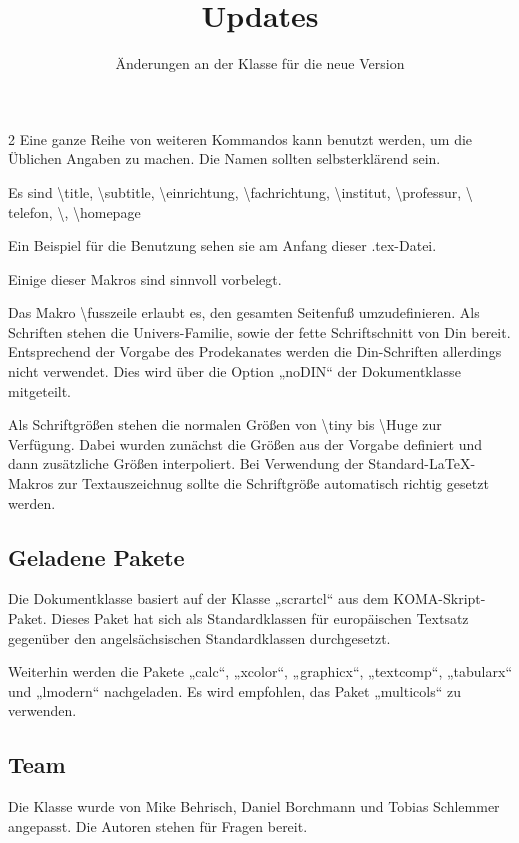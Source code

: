 \documentclass[serifmath,a0paper,noDIN,Mathematik]{tudmathposter}
\begin{document}
\begin{multicols}2
  Eine ganze Reihe von weiteren Kommandos kann benutzt werden, um
  die Üblichen Angaben zu machen. Die Namen sollten selbsterklärend
  sein.

  Es sind \textbackslash title, \textbackslash subtitle,
  \textbackslash einrichtung, \textbackslash fachrichtung,
  \textbackslash institut, \textbackslash professur, \textbackslash
  telefon, \textbackslash \fax, \textbackslash homepage
  
  Ein Beispiel für die Benutzung sehen sie am Anfang dieser .tex-Datei.
  
  Einige dieser Makros sind sinnvoll vorbelegt.
  
  Das Makro
  \textbackslash fusszeile erlaubt es, den gesamten Seitenfuß
  umzudefinieren.
  Als Schriften stehen die Univers-Familie, sowie der fette
  Schriftschnitt von Din bereit. Entsprechend der Vorgabe des
  Prodekanates werden die Din-Schriften allerdings nicht
  verwendet. Dies wird über die Option „noDIN“ der Dokumentklasse
  mitgeteilt.

  Als Schriftgrößen stehen die normalen Größen von \textbackslash tiny
  bis \textbackslash Huge zur Verfügung. Dabei wurden zunächst die
  Größen aus der Vorgabe definiert und dann zusätzliche Größen
  interpoliert. Bei Verwendung der Standard-\LaTeX-Makros zur
  Textauszeichnug sollte die Schriftgröße automatisch richtig gesetzt
  werden.
  \enlargethispage{4\baselineskip}
\subsection{Geladene Pakete}
  Die Dokumentklasse basiert auf der Klasse „scrartcl“ aus dem
  KOMA-Skript-Paket. Dieses Paket hat sich als Standardklassen für
  europäischen Textsatz gegenüber den angelsächsischen Standardklassen
  durchgesetzt.

  Weiterhin werden die Pakete „calc“, „xcolor“, „graphicx“,
  „textcomp“, „tabularx“ und „lmodern“ nachgeladen. Es wird empfohlen,
  das Paket „multicols“ zu verwenden.

  \subsection{Team}
  Die Klasse wurde von Mike Behrisch, Daniel Borchmann und Tobias
  Schlemmer angepasst. Die Autoren stehen für Fragen bereit.
\end{multicols}
\pagebreak
\fax{}%
\title{Updates}%
\subtitle{Änderungen an der Klasse für die neue Version}
\maketitle
\end{document}
